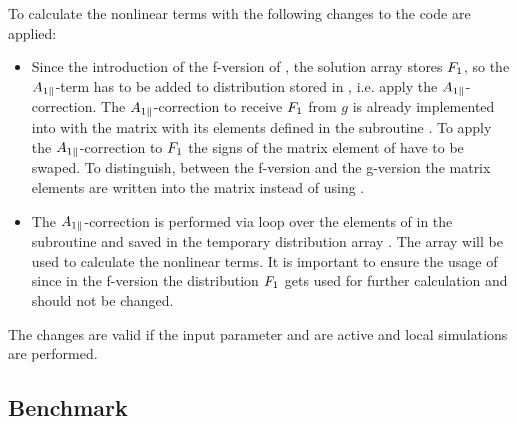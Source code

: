 To calculate the nonlinear terms with {\gkw} the following changes to the code are applied:
\begin{itemize}
    \item Since the introduction of the f-version of {\gkw}, the solution array  stores $F_1$, so the $A_{1\parallel}$-term has to be added to distribution stored in , i.e. apply the $A_{1\parallel}$-correction. The $A_{1\parallel}$-correction to receive $F_1$ from $g$ is already implemented into {\gkw} with the matrix  with its elements defined in the subroutine . To apply the $A_{1\parallel}$-correction to $F_1$ the signs of the matrix element of  have to be swaped. To distinguish, between the f-version and the g-version the matrix elements are written into the matrix  instead of using .
    \item The $A_{1\parallel}$-correction is performed via loop over the elements of  in the subroutine  and saved in the temporary distribution array . The array  will be used to calculate the nonlinear terms. It is important to ensure the usage of  since in the f-version the distribution $F_1$ gets used for further calculation and should not be changed.
\end{itemize}
The changes are valid if the input parameter  and  are active and local simulations are performed.

\subsection{Benchmark}
\label{sub:benchmarkNonlinearFVersion}

